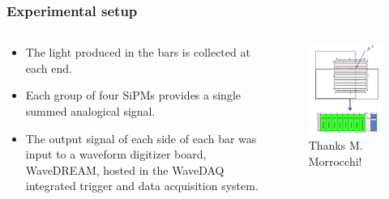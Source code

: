 \begin{frame} [fragile]
	\frametitle{Experimental setup}
	\begin{columns}
  		\begin{column}{0.50\textwidth}
            \begin{itemize}
                \item The light produced in the bars is collected at each end.
                \item Each group of four SiPMs provides a single summed analogical signal.
                \item The output signal of each side of each bar was input to a waveform digitizer board, WaveDREAM, hosted in the WaveDAQ integrated trigger and data acquisition system.
            \end{itemize}
		\end{column}
    \begin{column}{0.50\textwidth}
 		\newline
			\begin{figure}
	  		    \centering
				\includegraphics[scale=0.25]{figures/setup.png}
                \caption{Thanks M. Morrocchi!}
			\end{figure}
    \end{column}
\end{columns}
\end{frame}